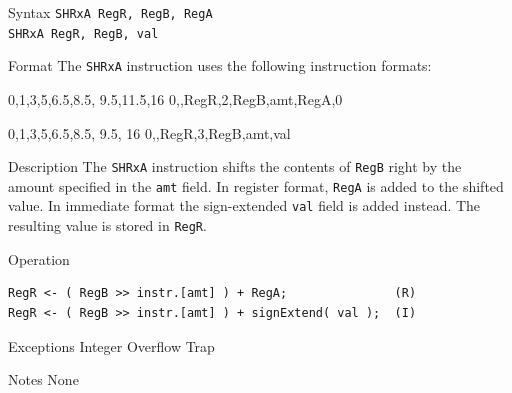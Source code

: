 %
%
\pagebreak
{}

\begin{iPageDescEntry}{Syntax}
\texttt{SHRxA RegR, RegB, RegA} \\
\texttt{SHRxA RegR, RegB, val}
\end{iPageDescEntry}

\begin{iPageDescEntry}{Format}
The \texttt{SHRxA} instruction uses the following instruction formats: \\

\begin{flushleft}
\drawInstrFormat
    {0,1,3,5,6.5,8.5, 9.5,11.5,16}
    {0,\OpCodeSHRxA,RegR,2,RegB,amt,RegA,0}
\end{flushleft}

\medskip
\begin{flushleft}
\drawInstrFormat
    {0,1,3,5,6.5,8.5, 9.5, 16}
    {0,\OpCodeSHRxA,RegR,3,RegB,amt,val}
\end{flushleft}
\end{iPageDescEntry}

\begin{iPageDescEntry}{Description}
The \texttt{SHRxA} instruction shifts the contents of \texttt{RegB} right by the amount specified in the \texttt{amt} field. In register format, \texttt{RegA} is added to the shifted value. In immediate format the sign-extended \texttt{val} field is added instead. The resulting value is stored in \texttt{RegR}.
\end{iPageDescEntry}

\begin{iPageDescOpEntry}{Operation}
\begin{lstlisting}[style=iPageOpStyle]
RegR <- ( RegB >> instr.[amt] ) + RegA;               (R)
RegR <- ( RegB >> instr.[amt] ) + signExtend( val );  (I)
\end{lstlisting}
\end{iPageDescOpEntry}

\begin{iPageDescEntry}{Exceptions}
Integer Overflow Trap
\end{iPageDescEntry}

\begin{iPageDescEntry}{Notes}
None
\end{iPageDescEntry}

